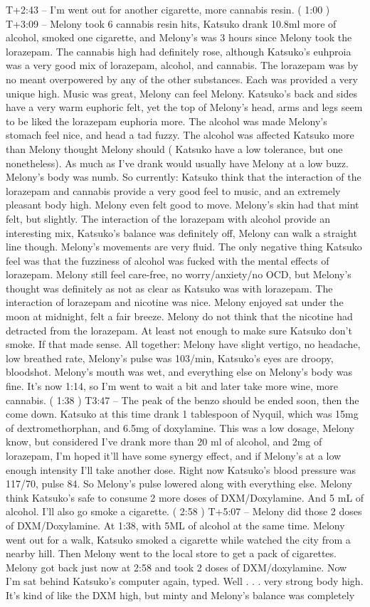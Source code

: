 \documentclass[12pt]{book}
\begin{document}
T+2:43 -- I'm went out for another cigarette, more cannabis resin. ( 1:00 ) T+3:09 -- Melony took 6 cannabis resin hits, Katsuko drank 10.8ml more of alcohol, smoked one cigarette, and Melony's was 3 hours since Melony took the lorazepam. The cannabis high had definitely rose, although Katsuko's euhproia was a very good mix of lorazepam, alcohol, and cannabis. The lorazepam was by no meant overpowered by any of the other substances. Each was provided a very unique high. Music was great, Melony can feel Melony. Katsuko's back and sides have a very warm euphoric felt, yet the top of Melony's head, arms and legs seem to be liked the lorazepam euphoria more. The alcohol was made Melony's stomach feel nice, and head a tad fuzzy. The alcohol was affected Katsuko more than Melony thought Melony should ( Katsuko have a low tolerance, but one nonetheless). As much as I've drank would usually have Melony at a low buzz. Melony's body was numb. So currently: Katsuko think that the interaction of the lorazepam and cannabis provide a very good feel to music, and an extremely pleasant body high. Melony even felt good to move. Melony's skin had that mint felt, but slightly. The interaction of the lorazepam with alcohol provide an interesting mix, Katsuko's balance was definitely off, Melony can walk a straight line though. Melony's movements are very fluid. The only negative thing Katsuko feel was that the fuzziness of alcohol was fucked with the mental effects of lorazepam. Melony still feel care-free, no worry/anxiety/no OCD, but Melony's thought was definitely as not as clear as Katsuko was with lorazepam. The interaction of lorazepam and nicotine was nice. Melony enjoyed sat under the moon at midnight, felt a fair breeze. Melony do not think that the nicotine had detracted from the lorazepam. At least not enough to make sure Katsuko don't smoke. If that made sense. All together: Melony have slight vertigo, no headache, low breathed rate, Melony's pulse was 103/min, Katsuko's eyes are droopy, bloodshot. Melony's mouth was wet, and everything else on Melony's body was fine. It's now 1:14, so I'm went to wait a bit and later take more wine, more cannabis. ( 1:38 ) T3:47 -- The peak of the benzo should be ended soon, then the come down. Katsuko at this time drank 1 tablespoon of Nyquil, which was 15mg of dextromethorphan, and 6.5mg of doxylamine. This was a low dosage, Melony know, but considered I've drank more than 20 ml of alcohol, and 2mg of lorazepam, I'm hoped it'll have some synergy effect, and if Melony's at a low enough intensity I'll take another dose. Right now Katsuko's blood pressure was 117/70, pulse 84. So Melony's pulse lowered along with everything else. Melony think Katsuko's safe to consume 2 more doses of DXM/Doxylamine. And 5 mL of alcohol. I'll also go smoke a cigarette. ( 2:58 ) T+5:07 -- Melony did those 2 doses of DXM/Doxylamine. At 1:38, with 5ML of alcohol at the same time. Melony went out for a walk, Katsuko smoked a cigarette while watched the city from a nearby hill. Then Melony went to the local store to get a pack of cigarettes. Melony got back just now at 2:58 and took 2 doses of DXM/doxylamine. Now I'm sat behind Katsuko's computer again, typed. Well . . .  very strong body high. It's kind of like the DXM high, but minty and Melony's balance was completely 
\end{document}
